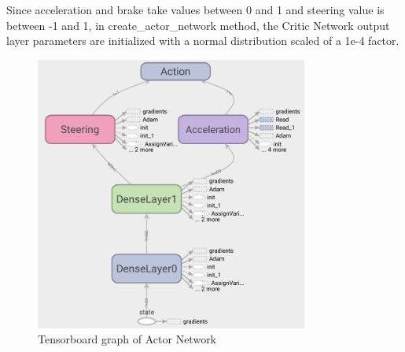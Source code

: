 \documentclass[Lau,oneside,noexaminfo]{sapthesis} %
\begin{document}
\clearpage
Since acceleration and brake take values between 0 and 1 and steering value is between -1 and 1, in create\_actor\_network method, the Critic Network output layer parameters are initialized with a normal distribution scaled of a 1e-4 factor.
\begin{figure}[H]
\caption{Tensorboard graph of Actor Network}
\centering
\includegraphics[width=0.8\textwidth]{actor}
\end{figure}
\end{document}
